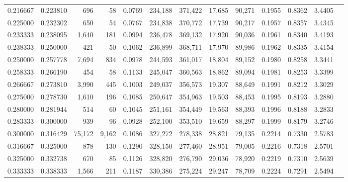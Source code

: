\begin{tabular}{rrrrrrrrrrrrr}
0.216667 & 0.223810 &    696 &     58 &                                     0.0769 & 234,188 & 371,422 &  17,685 &  90,271 & 0.1955 & 0.8362 & 3.4405 \\
0.225000 & 0.232302 &    650 &     54 &                                     0.0767 & 234,838 & 370,772 &  17,739 &  90,217 & 0.1957 & 0.8357 & 3.4345 \\
0.233333 & 0.238095 &  1,640 &    181 &                                     0.0994 & 236,478 & 369,132 &  17,920 &  90,036 & 0.1961 & 0.8340 & 3.4193 \\
0.238333 & 0.250000 &    421 &     50 &                                     0.1062 & 236,899 & 368,711 &  17,970 &  89,986 & 0.1962 & 0.8335 & 3.4154 \\
0.250000 & 0.257778 &  7,694 &    834 &                                     0.0978 & 244,593 & 361,017 &  18,804 &  89,152 & 0.1980 & 0.8258 & 3.3441 \\
0.258333 & 0.266190 &    454 &     58 &                                     0.1133 & 245,047 & 360,563 &  18,862 &  89,094 & 0.1981 & 0.8253 & 3.3399 \\
0.266667 & 0.273810 &  3,990 &    445 &                                     0.1003 & 249,037 & 356,573 &  19,307 &  88,649 & 0.1991 & 0.8212 & 3.3029 \\
0.275000 & 0.278730 &  1,610 &    196 &                                     0.1085 & 250,647 & 354,963 &  19,503 &  88,453 & 0.1995 & 0.8193 & 3.2880 \\
0.280000 & 0.281944 &    514 &     60 &                                     0.1045 & 251,161 & 354,449 &  19,563 &  88,393 & 0.1996 & 0.8188 & 3.2833 \\
0.283333 & 0.300000 &    939 &     96 &                                     0.0928 & 252,100 & 353,510 &  19,659 &  88,297 & 0.1999 & 0.8179 & 3.2746 \\
0.300000 & 0.316429 & 75,172 &  9,162 &                                     0.1086 & 327,272 & 278,338 &  28,821 &  79,135 & 0.2214 & 0.7330 & 2.5783 \\
0.316667 & 0.325000 &    878 &    130 &                                     0.1290 & 328,150 & 277,460 &  28,951 &  79,005 & 0.2216 & 0.7318 & 2.5701 \\
0.325000 & 0.332738 &    670 &     85 &                                     0.1126 & 328,820 & 276,790 &  29,036 &  78,920 & 0.2219 & 0.7310 & 2.5639 \\
0.333333 & 0.338333 &  1,566 &    211 &                                     0.1187 & 330,386 & 275,224 &  29,247 &  78,709 & 0.2224 & 0.7291 & 2.5494 \\

\end{tabular}
